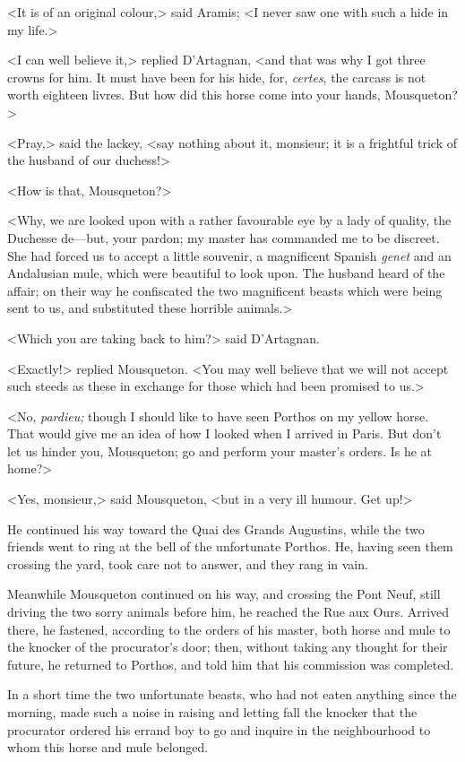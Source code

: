 <It is of an original colour,> said Aramis; <I never saw one with such a hide in my life.> 

<I can well believe it,> replied D'Artagnan, <and that was why I got three crowns for him. It must have been for his hide, for, \textit{certes}, the carcass is not worth eighteen livres. But how did this horse come into your hands, Mousqueton?> 

<Pray,> said the lackey, <say nothing about it, monsieur; it is a frightful trick of the husband of our duchess!> 

<How is that, Mousqueton?> 

<Why, we are looked upon with a rather favourable eye by a lady of quality, the Duchesse de—but, your pardon; my master has commanded me to be discreet. She had forced us to accept a little souvenir, a magnificent Spanish \textit{genet} and an Andalusian mule, which were beautiful to look upon. The husband heard of the affair; on their way he confiscated the two magnificent beasts which were being sent to us, and substituted these horrible animals.> 

<Which you are taking back to him?> said D'Artagnan. 

<Exactly!> replied Mousqueton. <You may well believe that we will not accept such steeds as these in exchange for those which had been promised to us.> 

<No, \textit{pardieu;} though I should like to have seen Porthos on my yellow horse. That would give me an idea of how I looked when I arrived in Paris. But don't let us hinder you, Mousqueton; go and perform your master's orders. Is he at home?> 

<Yes, monsieur,> said Mousqueton, <but in a very ill humour. Get up!> 

He continued his way toward the Quai des Grands Augustins, while the two friends went to ring at the bell of the unfortunate Porthos. He, having seen them crossing the yard, took care not to answer, and they rang in vain. 

Meanwhile Mousqueton continued on his way, and crossing the Pont Neuf, still driving the two sorry animals before him, he reached the Rue aux Ours. Arrived there, he fastened, according to the orders of his master, both horse and mule to the knocker of the procurator's door; then, without taking any thought for their future, he returned to Porthos, and told him that his commission was completed. 

In a short time the two unfortunate beasts, who had not eaten anything since the morning, made such a noise in raising and letting fall the knocker that the procurator ordered his errand boy to go and inquire in the neighbourhood to whom this horse and mule belonged. 

